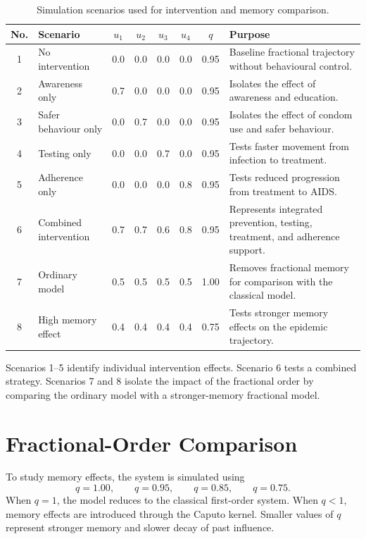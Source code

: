 \documentclass[12pt,a4paper,oneside]{report}
\begin{document}
\begin{table}[H]
\centering
\caption{Simulation scenarios used for intervention and memory comparison.}
\label{tab:simulation_scenarios_improved}
\small
\begin{tabularx}{\textwidth}{c l c c c c c X}
\toprule
No. & Scenario & $u_1$ & $u_2$ & $u_3$ & $u_4$ & $q$ & Purpose\\
\midrule
1 & No intervention & 0.0 & 0.0 & 0.0 & 0.0 & 0.95 & Baseline fractional trajectory without behavioural control.\\
2 & Awareness only & 0.7 & 0.0 & 0.0 & 0.0 & 0.95 & Isolates the effect of awareness and education.\\
3 & Safer behaviour only & 0.0 & 0.7 & 0.0 & 0.0 & 0.95 & Isolates the effect of condom use and safer behaviour.\\
4 & Testing only & 0.0 & 0.0 & 0.7 & 0.0 & 0.95 & Tests faster movement from infection to treatment.\\
5 & Adherence only & 0.0 & 0.0 & 0.0 & 0.8 & 0.95 & Tests reduced progression from treatment to AIDS.\\
6 & Combined intervention & 0.7 & 0.7 & 0.6 & 0.8 & 0.95 & Represents integrated prevention, testing, treatment, and adherence support.\\
7 & Ordinary model & 0.5 & 0.5 & 0.5 & 0.5 & 1.00 & Removes fractional memory for comparison with the classical model.\\
8 & High memory effect & 0.4 & 0.4 & 0.4 & 0.4 & 0.75 & Tests stronger memory effects on the epidemic trajectory.\\
\bottomrule
\end{tabularx}
\end{table}

\begin{scenariobox}[title={Scenario interpretation}]
Scenarios 1--5 identify individual intervention effects. Scenario 6 tests a combined strategy. Scenarios 7 and 8 isolate the impact of the fractional order by comparing the ordinary model with a stronger-memory fractional model.
\end{scenariobox}

\section{Fractional-Order Comparison}

To study memory effects, the system is simulated using
\[
q=1.00,\qquad q=0.95,\qquad q=0.85,\qquad q=0.75.
\]
When $q=1$, the model reduces to the classical first-order system. When $q<1$, memory effects are introduced through the Caputo kernel. Smaller values of $q$ represent stronger memory and slower decay of past influence.
\end{document}
